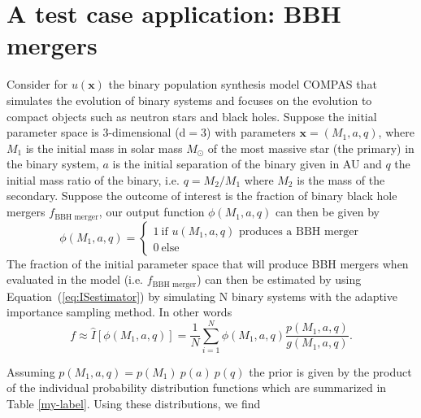 \documentclass[a4paper,fleqn,usenatbib]{mnras}
\begin{document}
\section{A test case application: BBH mergers}
%
Consider for $u(\mathbf{x})$ the binary population synthesis model COMPAS  that simulates the evolution of binary systems and focuses on the evolution to compact objects such as neutron stars and black holes. 
Suppose the initial parameter space is 3-dimensional (d$=3$) with parameters $\mathbf{x} = (M_1, a, q)$, where $M_1$ is the initial mass in solar mass $M_{\odot}$ of the most massive star (the primary) in the binary system, $a$ is the initial separation of the binary given in AU and $q$ the initial mass ratio of the binary, i.e. $q = M_2/M_1$ where $M_2$ is the mass of the secondary.  
%
%
Suppose the outcome of interest is the fraction of binary black hole mergers $f_{\text{BBH merger}}$, our output function $\phi(M_1,a,q)$ can then be given by 
%
\begin{equation}
    \phi({M_1,a,q}) = \begin{cases} 
    1  \ \text{if } u(M_1,a,q) \text{ produces a BBH merger} \\
    0  \ \text{else}     \end{cases}
	\label{eq:ex-output-phi}
\end{equation} 
%
The fraction of the initial parameter space that will produce BBH mergers when evaluated in the model (i.e. $f_{\text{BBH merger}}$) can then be estimated by using Equation~(\ref{eq:ISestimator}) by simulating N binary systems with the adaptive importance sampling method. In other words 
%
\begin{equation}
    f \approx \hat{I}[\phi(M_1,a,q)] = \frac{1}{N} \sum_{i=1}^{N} \phi(M_1,a,q) \frac{p(M_1,a,q)}{g(M_1,a,q)}. 
	\label{eq:ex-ISestimator}
\end{equation}

Assuming  $p({M_1,a,q}) = p(M_1) \  p(a)  \  p(q)$ the prior is given by the product of the individual probability distribution functions which are summarized in Table  \ref{my-label}. Using these distributions, we find
%
\end{document}
